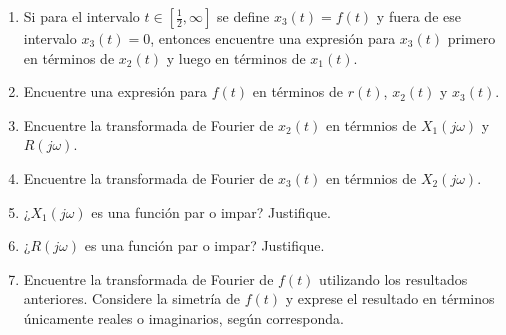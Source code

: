 \begin{ejercicio}
\begin{enumerate}
        \item Si para el intervalo $t\in \left[\frac{1}{2},\infty\right]$ se define $x_3(t)=f(t)$ y fuera de ese intervalo $x_3(t) = 0$, entonces encuentre una expresión para $x_3(t)$ primero en términos de $x_2(t)$ y luego en términos de $x_1(t)$.
        \item Encuentre una expresión para $f(t)$ en términos de $r(t)$, $x_2(t)$ y $x_3(t)$.
        \item Encuentre la transformada de Fourier de $x_2(t)$ en térmnios de $X_1(j\omega)$ y $R(j\omega)$.
        \item Encuentre la transformada de Fourier de $x_3(t)$ en térmnios de $X_2(j\omega)$.
        \item ¿$X_1(j\omega)$ es una función par o impar? Justifique.
        \item ¿$R(j\omega)$ es una función par o impar? Justifique.
        \item Encuentre la transformada de Fourier de $f(t)$ utilizando los resultados anteriores. Considere la simetría de $f(t)$ y exprese el resultado en términos únicamente reales o imaginarios, según corresponda.
    \end{enumerate}
\end{ejercicio}
